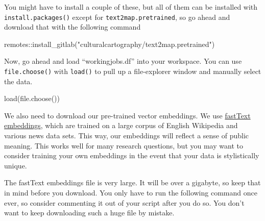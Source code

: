 \documentclass[
  letterpaper,
  DIV=11,
  numbers=noendperiod]{scrreprt}
\newenvironment{Shaded}{\begin{snugshade}}{\end{snugshade}}
\newcommand{\FunctionTok}[1]{\textcolor[rgb]{0.28,0.35,0.67}{#1}}
\newcommand{\NormalTok}[1]{\textcolor[rgb]{0.00,0.23,0.31}{#1}}
\newcommand{\SpecialCharTok}[1]{\textcolor[rgb]{0.37,0.37,0.37}{#1}}
\newcommand{\StringTok}[1]{\textcolor[rgb]{0.13,0.47,0.30}{#1}}
\begin{document}
You might have to install a couple of these, but all of them can be
installed with \texttt{install.packages()} except for
\texttt{text2map.pretrained}, so go ahead and download that with the
following command

\begin{Shaded}
\begin{Highlighting}[]
\NormalTok{remotes}\SpecialCharTok{::}\FunctionTok{install\_gitlab}\NormalTok{(}\StringTok{"culturalcartography/text2map.pretrained"}\NormalTok{)}
\end{Highlighting}
\end{Shaded}

Now, go ahead and load ``workingjobs.df'' into your workspace. You can
use \texttt{file.choose()} with \texttt{load()} to pull up a
file-explorer window and manually select the data.

\begin{Shaded}
\begin{Highlighting}[]
\FunctionTok{load}\NormalTok{(}\FunctionTok{file.choose}\NormalTok{())}
\end{Highlighting}
\end{Shaded}

We also need to download our pre-trained vector embeddings. We use
\href{https://fasttext.cc/docs/en/english-vectors.html}{fastText
embeddings}, which are trained on a large corpus of English Wikipedia
and various news data sets. This way, our embeddings will reflect a
sense of public meaning. This works well for many research questions,
but you may want to consider training your own embeddings in the event
that your data is stylistically unique.

\begin{tcolorbox}[enhanced jigsaw, colback=white, title=\textcolor{quarto-callout-caution-color}{\faFire}\hspace{0.5em}{Caution}, coltitle=black, bottomrule=.15mm, breakable, opacityback=0, colframe=quarto-callout-caution-color-frame, leftrule=.75mm, opacitybacktitle=0.6, arc=.35mm, rightrule=.15mm, bottomtitle=1mm, toptitle=1mm, titlerule=0mm, toprule=.15mm, left=2mm, colbacktitle=quarto-callout-caution-color!10!white]

The fastText embeddings file is very large. It will be over a gigabyte,
so keep that in mind before you download. You only have to run the
following command once ever, so consider commenting it out of your
script after you do so. You don't want to keep downloading such a huge
file by mistake.

\end{tcolorbox}
\end{document}
